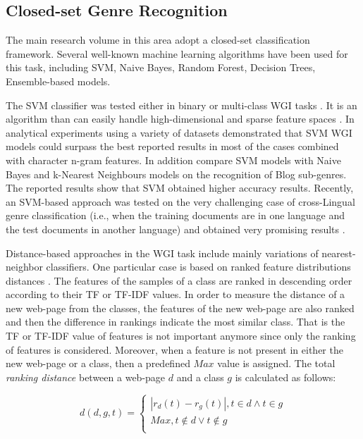 \subsection{Closed-set Genre Recognition}

The main research volume in this area adopt a closed-set classification framework. Several well-known machine learning algorithms have been used for this task, including SVM, Naive Bayes, Random Forest, Decision Trees, Ensemble-based models. 

The SVM classifier was tested either in binary or multi-class WGI tasks \parencite{dai2018fine}. It is an algorithm than can easily handle high-dimensional and sparse feature spaces \parencite{joachims1997probabilistic}. In  analytical experiments using a variety of datasets demonstrated that SVM WGI models could surpass the best reported results in most of the cases combined with character n-gram features. In addition \parencite{virik2017blog} compare SVM models with Naive Bayes and k-Nearest Neighbours models on the recognition of Blog sub-genres. The reported results show that SVM obtained higher accuracy results. Recently, an SVM-based approach was tested on the very challenging case of cross-Lingual genre classification (i.e., when the training documents are in one language and the test documents in another language) and obtained very promising results \parencite{nguyen2019cross}. 

Distance-based approaches in the WGI task include mainly variations of nearest-neighbor classifiers. One particular case is based on ranked feature distributions distances \parencite{waltinger2010feature}. The features of the samples of a class are ranked in descending order according to their TF or TF-IDF values. In order to measure the distance of a new web-page from the classes, the features of the new web-page are also ranked and then the difference in rankings indicate the most similar class. That is the TF or TF-IDF value of features is not important anymore since only the ranking of features is considered. Moreover, when a feature is not present in either the new web-page or a class, then a predefined $Max$ value is assigned. The total \textit{ranking distance} between a web-page $d$ and a class $g$ is calculated as follows:

\begin{equation}\label{eq:ranking_distance}
	d(d,g,t) =
      \begin{cases}
      	| r_{d}(t) - r_{g}(t) |, t \in d \wedge t \in g  \\
        Max, t \notin d \vee t \notin g \\ 
       \end{cases}
\end{equation}

